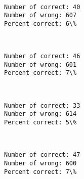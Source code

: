 \documentclass[11pt]{article}
\begin{document}
    \begin{center}
    \end{center}
    { \hspace*{\fill} \\}
    
    \begin{Verbatim}[commandchars=\\\{\}]
Number of correct: 40
Number of wrong: 607
Percent correct: 6\%

    \end{Verbatim}

    \begin{center}
    \end{center}
    { \hspace*{\fill} \\}
    
    \begin{Verbatim}[commandchars=\\\{\}]
Number of correct: 46
Number of wrong: 601
Percent correct: 7\%

    \end{Verbatim}

    \begin{center}
    \end{center}
    { \hspace*{\fill} \\}
    
    \begin{Verbatim}[commandchars=\\\{\}]
Number of correct: 33
Number of wrong: 614
Percent correct: 5\%

    \end{Verbatim}

    \begin{center}
    \end{center}
    { \hspace*{\fill} \\}
    
    \begin{Verbatim}[commandchars=\\\{\}]
Number of correct: 47
Number of wrong: 600
Percent correct: 7\%

    \end{Verbatim}
\end{document}
